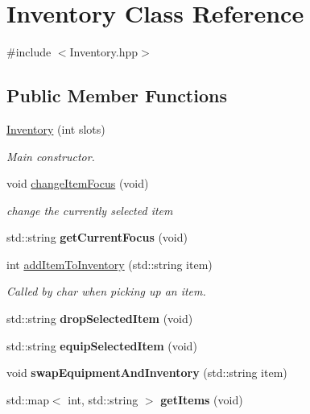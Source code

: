 \hypertarget{class_inventory}{\section{Inventory Class Reference}
\label{class_inventory}
}


{\ttfamily \#include $<$Inventory.\+hpp$>$}

\subsection*{Public Member Functions}
\begin{DoxyCompactItemize}
\item 
\hyperlink{class_inventory_a4d40dda87c7d37ebc185368b5493ab6e}{Inventory} (int slots)
\begin{DoxyCompactList}\small\item\em Main constructor. \end{DoxyCompactList}\item 
void \hyperlink{class_inventory_ac81fb1502f38a7d6b61019e0de7926e9}{change\+Item\+Focus} (void)
\begin{DoxyCompactList}\small\item\em change the currently selected item \end{DoxyCompactList}\item 
\hypertarget{class_inventory_a7d70b2f66af411fb252acffe3247614f}{std\+::string {\bfseries get\+Current\+Focus} (void)}\label{class_inventory_a7d70b2f66af411fb252acffe3247614f}

\item 
int \hyperlink{class_inventory_a1b0ece283e2501901893f7c8d8ab9276}{add\+Item\+To\+Inventory} (std\+::string item)
\begin{DoxyCompactList}\small\item\em Called by char when picking up an item. \end{DoxyCompactList}\item 
\hypertarget{class_inventory_a0fdfe38dc4a8278e9d4be64302084e41}{std\+::string {\bfseries drop\+Selected\+Item} (void)}\label{class_inventory_a0fdfe38dc4a8278e9d4be64302084e41}

\item 
\hypertarget{class_inventory_a82fd79276d1a6ac0c6ab8d2fa5774c6a}{std\+::string {\bfseries equip\+Selected\+Item} (void)}\label{class_inventory_a82fd79276d1a6ac0c6ab8d2fa5774c6a}

\item 
\hypertarget{class_inventory_ad3dd21be94724ceba8ff8a091ff19428}{void {\bfseries swap\+Equipment\+And\+Inventory} (std\+::string item)}\label{class_inventory_ad3dd21be94724ceba8ff8a091ff19428}

\item 
\hypertarget{class_inventory_a75780f1693233cef94fd700fff0660ba}{std\+::map$<$ int, std\+::string $>$ {\bfseries get\+Items} (void)}\label{class_inventory_a75780f1693233cef94fd700fff0660ba}

\end{DoxyCompactItemize}


